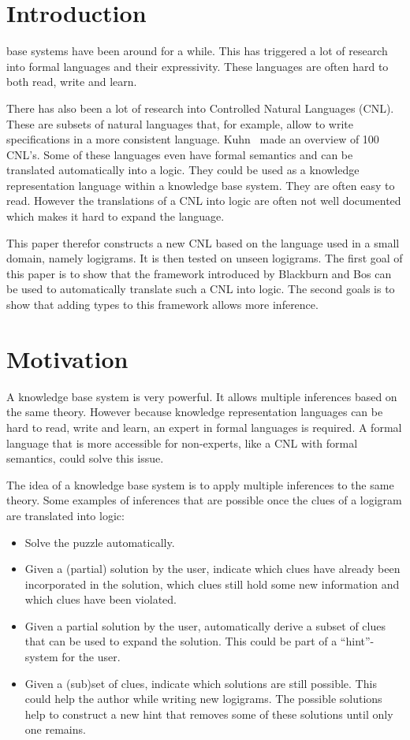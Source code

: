 \section{Introduction}

 base systems have been around for a while. This has triggered a lot of research into formal languages and their expressivity. These languages are often hard to both read, write and learn.

There has also been a lot of research into Controlled Natural Languages (CNL). These are subsets of natural languages that, for example, allow to write specifications in a more consistent language. Kuhn~\cite{Kuhn2014} made an overview of 100 CNL's. Some of these languages even have formal semantics and can be translated automatically into a logic. They could be used as a knowledge representation language within a knowledge base system. They are often easy to read. However the translations of a CNL into logic are often not well documented which makes it hard to expand the language.

This paper therefor constructs a new CNL based on the language used in a small domain, namely logigrams. It is then tested on unseen logigrams. The first goal of this paper is to show that the framework introduced by Blackburn and Bos \cite{Blackburn2005, Blackburn2006} can be used to automatically translate such a CNL into logic. The second goals is to show that adding types to this framework allows more inference.

\section{Motivation}
A knowledge base system is very powerful. It allows multiple inferences based on the same theory. However because knowledge representation languages can be hard to read, write and learn, an expert in formal languages is required. A formal language that is more accessible for non-experts, like a CNL with formal semantics, could solve this issue.

The idea of a knowledge base system is to apply multiple inferences to the same theory. Some examples of inferences that are possible once the clues of a logigram are translated into logic:
\begin{itemize}
  \item Solve the puzzle automatically.
  \item Given a (partial) solution by the user, indicate which clues have already been incorporated in the solution, which clues still hold some new information and which clues have been violated.
  \item Given a partial solution by the user, automatically derive a subset of clues that can be used to expand the solution. This could be part of a ``hint''-system for the user.
  \item Given a (sub)set of clues, indicate which solutions are still possible. This could help the author while writing new logigrams. The possible solutions help to construct a new hint that removes some of these solutions until only one remains.
\end{itemize}


